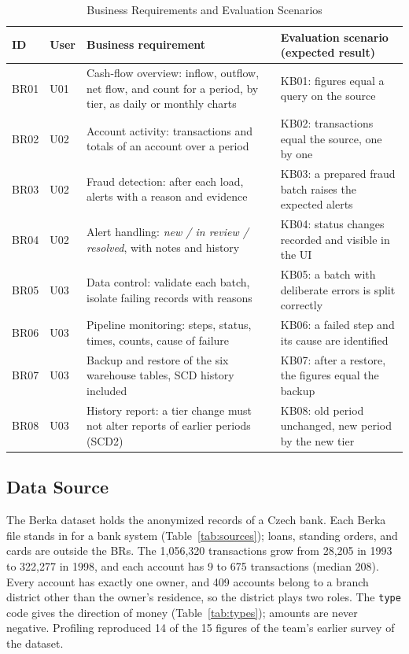 \documentclass[peerreview]{IEEEtran}
\newcommand{\tbl}[1]{\texttt{#1}}
\begin{document}
\begin{table}[!t]
\centering
\caption{Business Requirements and Evaluation Scenarios}
\label{tab:brs}
\small
\begin{tabular}{l l L{6.6cm} L{6.4cm}}
\toprule
\textbf{ID} & \textbf{User} & \textbf{Business requirement} & \textbf{Evaluation scenario (expected result)} \\
\midrule
BR01 & U01 & Cash-flow overview: inflow, outflow, net flow, and count for a period, by tier, as daily or monthly charts & KB01: figures equal a query on the source \\
BR02 & U02 & Account activity: transactions and totals of an account over a period & KB02: transactions equal the source, one by one \\
BR03 & U02 & Fraud detection: after each load, alerts with a reason and evidence & KB03: a prepared fraud batch raises the expected alerts \\
BR04 & U02 & Alert handling: \emph{new / in review / resolved}, with notes and history & KB04: status changes recorded and visible in the UI \\
BR05 & U03 & Data control: validate each batch, isolate failing records with reasons & KB05: a batch with deliberate errors is split correctly \\
BR06 & U03 & Pipeline monitoring: steps, status, times, counts, cause of failure & KB06: a failed step and its cause are identified \\
BR07 & U03 & Backup and restore of the six warehouse tables, SCD history included & KB07: after a restore, the figures equal the backup \\
BR08 & U03 & History report: a tier change must not alter reports of earlier periods (SCD2) & KB08: old period unchanged, new period by the new tier \\
\bottomrule
\end{tabular}
\end{table}

\subsection{Data Source}
\label{sec:data-source}
The Berka dataset \cite{berka1999} holds the anonymized records of a Czech bank. Each Berka
file stands in for a bank system (Table~\ref{tab:sources}); loans, standing orders, and cards
are outside the BRs. The 1,056,320 transactions grow from 28,205 in 1993 to 322,277 in 1998,
and each account has 9 to 675 transactions (median 208). Every account has exactly one owner,
and 409 accounts belong to a branch district other than the owner's residence, so the district
plays two roles. The \tbl{type} code gives the direction of money (Table~\ref{tab:types});
amounts are never negative. Profiling reproduced 14 of the 15 figures of the team's earlier
survey of the dataset.
\end{document}
